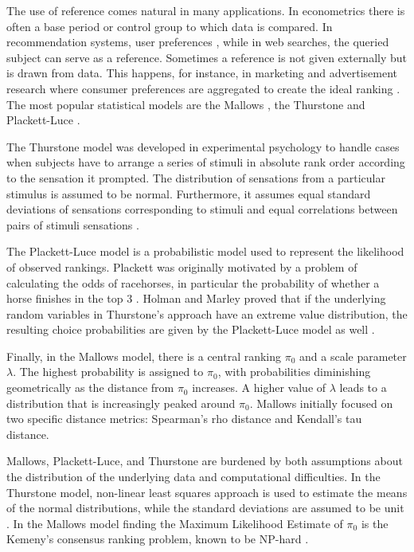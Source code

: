 The use of reference comes natural in many applications. In econometrics there is often a base period or control group to which data is compared. In recommendation systems, user preferences \citep{Bhowmik2017}, while in web searches, the queried subject \citep{Dwork2001} can serve as a reference. Sometimes a reference is not given externally but is drawn from data. This happens, for instance, in marketing and advertisement research where consumer preferences are aggregated to create the ideal ranking \citep{Lin2010,Haghani2021,Schuster2024}. %
The most popular statistical models are the Mallows \citep{mallowsNONNULLRANKINGMODELS1957}, the Thurstone \citep{thurstone1927law} and Plackett-Luce \citep{luce1959individual,Plackett1975}.

The Thurstone model was developed in experimental psychology to handle cases when subjects have to arrange a series of stimuli in absolute rank order according to the sensation it prompted. The distribution of sensations from a particular stimulus is assumed to be normal. Furthermore, it assumes equal standard deviations of sensations corresponding to stimuli and equal correlations between pairs of stimuli sensations \citep{Mosteller1951}.

The Plackett-Luce model is a probabilistic model used to represent the likelihood of observed rankings. Plackett was originally motivated by a problem of calculating the odds of racehorses, in particular the probability of whether a horse finishes in the top 3 \citep{Plackett1975}. Holman and Marley proved that if the underlying random variables in Thurstone's approach have an extreme value distribution, the resulting choice probabilities are given by the Plackett-Luce model as well \citep{Diaconis1988}.

Finally, in the Mallows model, there is a central ranking $\pi_0$ and a scale parameter $\lambda$. The highest probability is assigned to $\pi_0$, with probabilities diminishing geometrically as the distance from $\pi_0$ increases. A higher value of $\lambda$ leads to a distribution that is increasingly peaked around $\pi_0$. Mallows initially focused on two specific distance metrics: Spearman's rho distance and Kendall's tau distance.

Mallows, Plackett-Luce, and Thurstone are burdened by both assumptions about the distribution of the underlying data and computational difficulties. In the Thurstone model, non-linear least squares approach is used to estimate the means of the normal distributions, while the standard deviations are assumed to be unit \citep{Lin2010}. In the Mallows model finding the Maximum Likelihood Estimate of $\pi_0$ is the Kemeny’s consensus ranking problem, known to be NP-hard \citep{tang2019mallows}.

